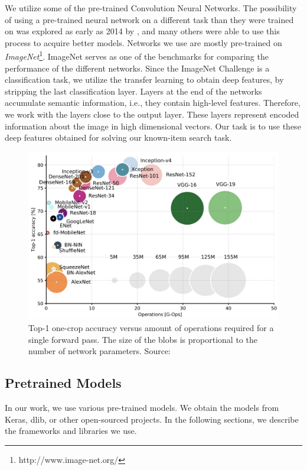 We utilize some of the pre-trained Convolution Neural Networks. The possibility of using a pre-trained neural network on a different task than they were trained on was explored as early as 2014 by \cite{donahuedeep}, and many others were able to use this process to acquire better models.  Networks we use are mostly pre-trained on \emph{ImageNet}\footnote{http://www.image-net.org/}. ImageNet serves as one of the benchmarks for comparing the performance of the different networks. Since the ImageNet Challenge is a classification task, we utilize the transfer learning to obtain deep features, by stripping the last classification layer. Layers at the end of the networks accumulate semantic information, i.e., they contain high-level features. Therefore, we work with the layers close to the output layer. These layers represent encoded information about the image in high dimensional vectors. Our task is to use these deep features obtained for solving our known-item search task.

\begin{figure}
    \centering
	\includegraphics[width=0.8\linewidth]{img/network-comparison.jpeg}
	\caption[Top-1 one-crop accuracy versus amount of operations required for a single forward pass]{Top-1 one-crop accuracy versus amount of operations required for a single forward pass. The size of the blobs is proportional to the number of network parameters. Source: \cite{canziani2016analysis}}
	\label{fig:camera-setup}
\end{figure}

\subsection{Pretrained Models}
\label{ss:pretrained_models}

In our work, we use various pre-trained models. We obtain the models from Keras, dlib, or other open-sourced projects. In the following sections, we describe the frameworks and libraries we use.

